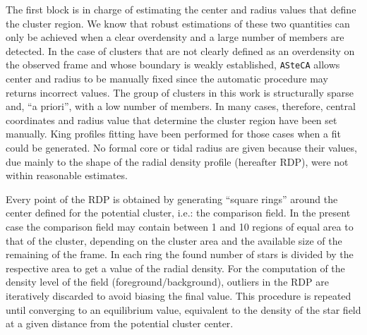 \documentclass[draft]{aa}
\begin{document}
The first block is in charge of estimating the center and radius values that
define the cluster region. We know that robust estimations
of these two quantities can only be achieved when a clear overdensity and a
large number of members are detected. In the case of clusters that are not
clearly defined as an overdensity on the observed frame and whose boundary is
weakly established, \texttt{ASteCA} allows center and radius to be manually
fixed since the automatic procedure may returns incorrect values. The group of
clusters in this work is structurally sparse and, ``a priori'', with a low
number of members.
In many cases, therefore, central coordinates and radius value that
determine the cluster region have been set manually. King profiles fitting have
been performed for those cases when a fit could be generated. No formal core or
tidal radius are given because their values, due mainly to the shape of the
radial density profile (hereafter RDP), were not within reasonable estimates.

Every point of the RDP is obtained by generating ``square rings'' around the
center defined for the potential cluster, i.e.: the comparison field.
In the present case the comparison field may contain between 1 and 10 regions
of equal area to that of the cluster, depending on the cluster area and the
available size of the remaining of the frame.
In each ring the found number of stars is divided by the respective area
to get a value of the radial density. For the computation of the density
level of the field (foreground/background), outliers in the RDP are iteratively
discarded to avoid biasing the final value. This procedure is repeated until
converging to an equilibrium value, equivalent to the density of the star field
at a given distance from the potential cluster center.\\
\end{document}
